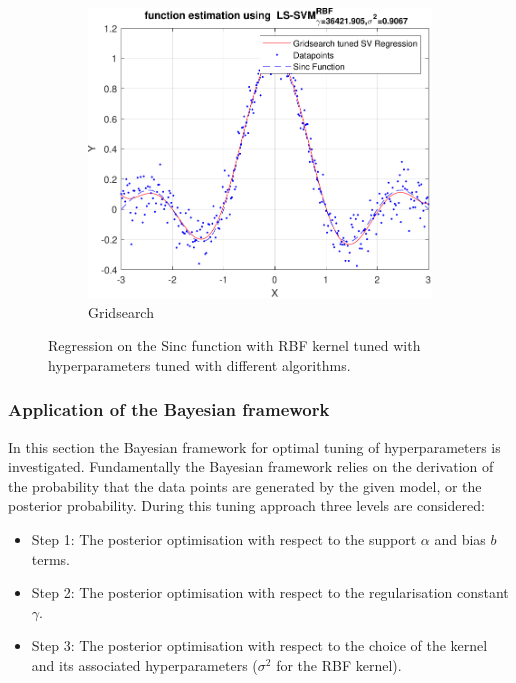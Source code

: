 \documentclass{article}
\begin{document}
\begin{figure}[h]
\begin{subfigure}[b]{0.4\textwidth}
                     \includegraphics[width=\textwidth]{Assignment 2/figures/1_2/rbf_tuning_results_grid.pdf}
                     \caption{Gridsearch}
                     \label{fig:regression_grisearch_tuned}
                 \end{subfigure}
                 \hspace{0.05\textwidth}
                \caption{Regression on the Sinc function with RBF kernel tuned with hyperparameters tuned with different algorithms.}
                \label{fig:smooth}
            \end{figure}
            
        \subsubsection{Application of the Bayesian framework}
        In this section the Bayesian framework for optimal tuning of hyperparameters is investigated. Fundamentally the Bayesian framework relies on the derivation of the probability that the data points are generated by the given model, or the posterior probability. During this tuning approach three levels are considered: 
        
        \begin{itemize}
            \item Step 1: The posterior optimisation with respect to the support $\alpha$ and bias $b$ terms.
            \item Step 2: The posterior optimisation with respect to the regularisation constant $\gamma$.
            \item Step 3: The posterior optimisation with respect to the choice of the kernel and its associated hyperparameters ($\sigma^2$ for the RBF kernel).
        \end{itemize}
        
\end{document}
